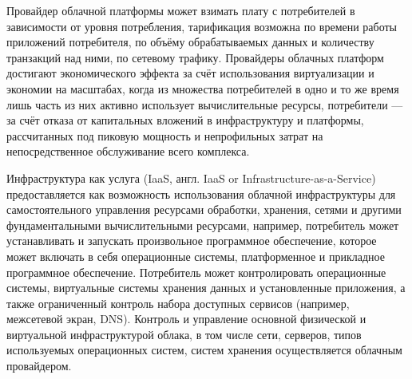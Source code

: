 Провайдер облачной платформы может взимать плату с потребителей в зависимости от уровня потребления, тарификация возможна по времени работы приложений потребителя, по объёму обрабатываемых данных и количеству транзакций над ними, по сетевому трафику. 
Провайдеры облачных платформ достигают экономического эффекта за счёт использования виртуализации и экономии на масштабах, когда из множества потребителей в одно и то же время лишь часть из них активно использует вычислительные ресурсы, потребители — за счёт отказа от капитальных вложений в инфраструктуру и платформы, рассчитанных под пиковую мощность и непрофильных затрат на непосредственное обслуживание всего комплекса.

Инфраструктура как услуга (IaaS, англ. IaaS or Infrastructure-as-a-Service) предоставляется как возможность использования облачной инфраструктуры для самостоятельного управления ресурсами обработки, хранения, сетями и другими фундаментальными вычислительными ресурсами, например, потребитель может устанавливать и запускать произвольное программное обеспечение, которое может включать в себя операционные системы, платформенное и прикладное программное обеспечение. 
Потребитель может контролировать операционные системы, виртуальные системы хранения данных и установленные приложения, а также ограниченный контроль набора доступных сервисов (например, межсетевой экран, DNS). 
Контроль и управление основной физической и виртуальной инфраструктурой облака, в том числе сети, серверов, типов используемых операционных систем, систем хранения осуществляется облачным провайдером.\cite{cloud-comp}

